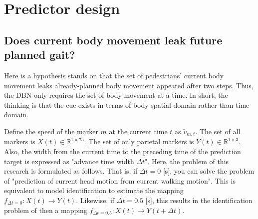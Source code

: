 \documentclass{sigchi}
\begin{document}
\section{Predictor design}%

\subsection{Does current body movement leak future planned gait?}

Here is a hypothesis stands on that the set of pedestrians' current body movement leaks already-planned body movement appeared after two steps. Thus, the DBN only requires the set of body movement at a time. In short, the thinking is that the cue exists in terms of body-spatial domain rather than time domain. 

Define the speed of the marker $m$ at the current time $t$ as $\check{v}_{m, t}$. The set of all markers is $X(t)\in\mathbb{R}^{1 \times 75} $. The set of only parietal markers is $ Y(t)\in\mathbb {R}^{1\times 3}$. Also, the width from the current time to the preceding time of the prediction target is expressed as "advance time width $\Delta t$". Here, the problem of this research is formulated as follows. That is, if $\Delta t = 0$ [s], you can solve the problem of "prediction of current head motion from current walking motion". This is equivalent to model identification to estimate the mapping $ f_ {\Delta t = 0}: X (t) \rightarrow Y (t) $. Likewise, if $ \Delta t = 0.5 $ [s], this results in the identification problem of then a mapping $ f_ {\Delta t = 0.5}: X (t) \rightarrow Y (t + \Delta t) $.
\end{document}
